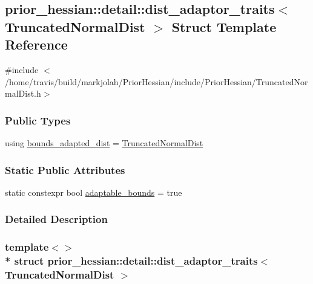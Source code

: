 \hypertarget{structprior__hessian_1_1detail_1_1dist__adaptor__traits_3_01TruncatedNormalDist_01_4}{}\subsection{prior\+\_\+hessian\+:\+:detail\+:\+:dist\+\_\+adaptor\+\_\+traits$<$ Truncated\+Normal\+Dist $>$ Struct Template Reference}
\label{structprior__hessian_1_1detail_1_1dist__adaptor__traits_3_01TruncatedNormalDist_01_4}


{\ttfamily \#include $<$/home/travis/build/markjolah/\+Prior\+Hessian/include/\+Prior\+Hessian/\+Truncated\+Normal\+Dist.\+h$>$}

\subsubsection*{Public Types}
\begin{DoxyCompactItemize}
\item 
using \hyperlink{structprior__hessian_1_1detail_1_1dist__adaptor__traits_3_01TruncatedNormalDist_01_4_a783f4b07a970a4883b389f31b3bde27b}{bounds\+\_\+adapted\+\_\+dist} = \hyperlink{namespaceprior__hessian_a47f38d4bb5d31fd3f01f5eb6ba6f1223}{Truncated\+Normal\+Dist}
\end{DoxyCompactItemize}
\subsubsection*{Static Public Attributes}
\begin{DoxyCompactItemize}
\item 
static constexpr bool \hyperlink{structprior__hessian_1_1detail_1_1dist__adaptor__traits_3_01TruncatedNormalDist_01_4_acaf702d55b85c9e5cc1c70fc99a22498}{adaptable\+\_\+bounds} = true
\end{DoxyCompactItemize}


\subsubsection{Detailed Description}
\subsubsection*{template$<$$>$\\*
struct prior\+\_\+hessian\+::detail\+::dist\+\_\+adaptor\+\_\+traits$<$ Truncated\+Normal\+Dist $>$}



